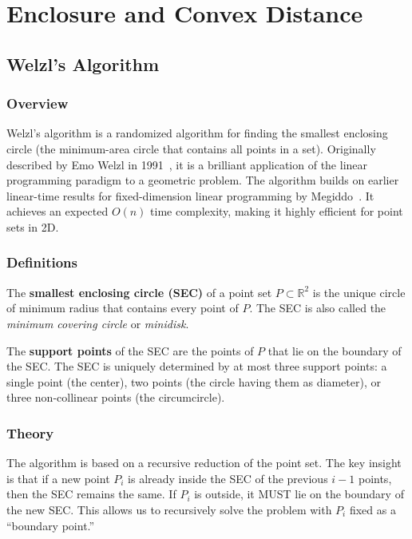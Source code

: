 \chapter{Enclosure and Convex Distance}
\label{ch:enclosure_convex_distance}

\section{Welzl's Algorithm}
\label{sec:welzls_algorithm}

\subsection{Overview}
Welzl's algorithm is a randomized algorithm for finding the smallest enclosing circle (the minimum-area circle that contains all points in a set). Originally described by Emo Welzl in 1991~\cite{welzl1991}, it is a brilliant application of the linear programming paradigm to a geometric problem. The algorithm builds on earlier linear-time results for fixed-dimension linear programming by Megiddo~\cite{megiddo1983}. It achieves an expected $O(n)$ time complexity, making it highly efficient for point sets in 2D.

\subsection{Definitions}

\begin{definition}\label{def:sec}
The \textbf{smallest enclosing circle (SEC)} of a point set $P \subset \mathbb{R}^2$ is the unique circle of minimum radius that contains every point of $P$. The SEC is also called the \emph{minimum covering circle} or \emph{minidisk}.
\end{definition}

\begin{definition}\label{def:support_points}
The \textbf{support points} of the SEC are the points of $P$ that lie on the boundary of the SEC. The SEC is uniquely determined by at most three support points: a single point (the center), two points (the circle having them as diameter), or three non-collinear points (the circumcircle).
\end{definition}

\subsection{Theory}
The algorithm is based on a recursive reduction of the point set. The key insight is that if a new point $P_i$ is already inside the SEC of the previous $i-1$ points, then the SEC remains the same. If $P_i$ is outside, it MUST lie on the boundary of the new SEC. This allows us to recursively solve the problem with $P_i$ fixed as a ``boundary point.''

